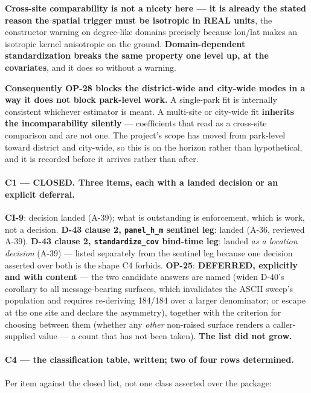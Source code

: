 \documentclass[
  10pt,
]{article}
\begin{document}
\textbf{Cross-site comparability is not a nicety here --- it is already the stated reason the spatial trigger must be isotropic in REAL units}, the constructor warning on degree-like domains precisely because lon/lat makes an isotropic kernel anisotropic on the ground. \textbf{Domain-dependent standardization breaks the same property one level up, at the covariates}, and it does so without a warning.

\textbf{Consequently OP-28 blocks the district-wide and city-wide modes in a way it does not block park-level work.} A single-park fit is internally consistent whichever estimator is meant. A multi-site or city-wide fit \textbf{inherits the incomparability silently} --- coefficients that read as a cross-site comparison and are not one. The project's scope has moved from park-level toward district and city-wide, so this is on the horizon rather than hypothetical, and it is recorded before it arrives rather than after.

\paragraph{C1 --- CLOSED. Three items, each with a landed decision or an explicit deferral.}
\textbf{CI-9}: decision landed (A-39); what is outstanding is enforcement, which is work, not a decision. \textbf{D-43 clause 2, \texttt{panel\_h\_m} sentinel leg}: landed (A-36, reviewed A-39). \textbf{D-43 clause 2, \texttt{standardize\_cov} bind-time leg}: landed \emph{as a location decision} (A-39) --- listed separately from the sentinel leg because one decision asserted over both is the shape C4 forbids. \textbf{OP-25}: \textbf{DEFERRED, explicitly and with content} --- the two candidate answers are named (widen D-40's corollary to all message-bearing surfaces, which invalidates the ASCII sweep's population and requires re-deriving 184/184 over a larger denominator; or escape at the one site and declare the asymmetry), together with the criterion for choosing between them (whether any \emph{other} non-raised surface renders a caller-supplied value --- a count that has not been taken). \textbf{The list did not grow.}

\paragraph{C4 --- the classification table, written; two of four rows determined.}
Per item against the closed list, not one class asserted over the package:
\end{document}
